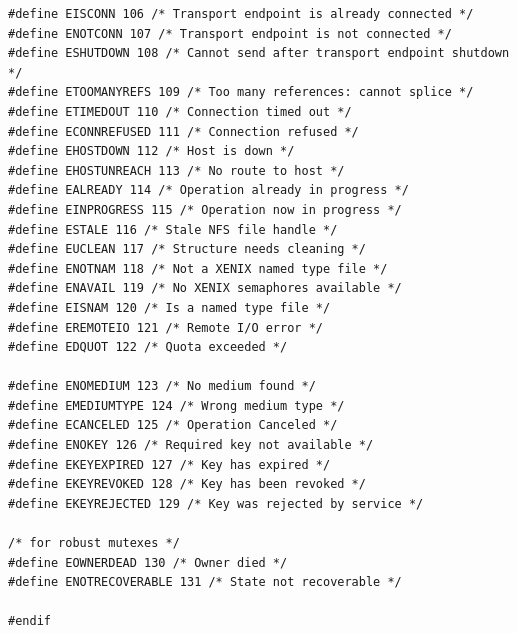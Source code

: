 \documentclass[french]{scrartcl}
\begin{document}
\begin{lstlisting}[multicols=2]
#define EISCONN 106 /* Transport endpoint is already connected */ 
#define ENOTCONN 107 /* Transport endpoint is not connected */ 
#define ESHUTDOWN 108 /* Cannot send after transport endpoint shutdown */ 
#define ETOOMANYREFS 109 /* Too many references: cannot splice */ 
#define ETIMEDOUT 110 /* Connection timed out */ 
#define ECONNREFUSED 111 /* Connection refused */ 
#define EHOSTDOWN 112 /* Host is down */ 
#define EHOSTUNREACH 113 /* No route to host */ 
#define EALREADY 114 /* Operation already in progress */ 
#define EINPROGRESS 115 /* Operation now in progress */ 
#define ESTALE 116 /* Stale NFS file handle */ 
#define EUCLEAN 117 /* Structure needs cleaning */ 
#define ENOTNAM 118 /* Not a XENIX named type file */ 
#define ENAVAIL 119 /* No XENIX semaphores available */ 
#define EISNAM 120 /* Is a named type file */ 
#define EREMOTEIO 121 /* Remote I/O error */ 
#define EDQUOT 122 /* Quota exceeded */  

#define ENOMEDIUM 123 /* No medium found */ 
#define EMEDIUMTYPE 124 /* Wrong medium type */ 
#define ECANCELED 125 /* Operation Canceled */ 
#define ENOKEY 126 /* Required key not available */ 
#define EKEYEXPIRED 127 /* Key has expired */ 
#define EKEYREVOKED 128 /* Key has been revoked */ 
#define EKEYREJECTED 129 /* Key was rejected by service */  

/* for robust mutexes */
#define EOWNERDEAD 130 /* Owner died */ 
#define ENOTRECOVERABLE 131 /* State not recoverable */  

#endif
\end{lstlisting}\vspace{-5pt}
\end{document}
